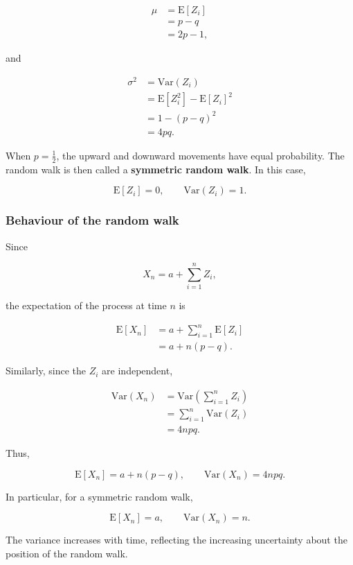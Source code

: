 \documentclass[
  letterpaper,
  DIV=11,
  numbers=noendperiod]{scrartcl}
\theoremstyle{definition}
\theoremstyle{remark}
\begin{document}
\[
\begin{aligned}
\mu
&=\mathrm{E}[Z_i]\\
&=p-q\\
&=2p-1,
\end{aligned}
\]

and

\[
\begin{aligned}
\sigma^2
&=\mathrm{Var}(Z_i)\\
&=\mathrm{E}[Z_i^2]-{\mathrm{E}[Z_i]}^2\\
&=1-(p-q)^2\\
&=4pq.
\end{aligned}
\]

When \(p=\frac12\), the upward and downward movements have equal
probability. The random walk is then called a \textbf{symmetric random
walk}. In this case,

\[
\mathrm{E}[Z_i]=0,
\qquad
\mathrm{Var}(Z_i)=1.
\]

\subsubsection{Behaviour of the random
walk}\label{behaviour-of-the-random-walk}

Since

\[
X_n=a+\sum_{i=1}^n Z_i,
\]

the expectation of the process at time \(n\) is

\[
\begin{aligned}
\mathrm{E}[X_n]
&=a+\sum_{i=1}^n\mathrm{E}[Z_i]\\
&=a+n(p-q).
\end{aligned}
\]

Similarly, since the \(Z_i\) are independent,

\[
\begin{aligned}
\mathrm{Var}(X_n)
&=\mathrm{Var}\left(\sum_{i=1}^n Z_i\right)\\
&=\sum_{i=1}^n\mathrm{Var}(Z_i)\\
&=4npq.
\end{aligned}
\]

Thus,

\[
\boxed{
\mathrm{E}[X_n]=a+n(p-q),
\qquad
\mathrm{Var}(X_n)=4npq.
}
\]

In particular, for a symmetric random walk,

\[
\mathrm{E}[X_n]=a,
\qquad
\mathrm{Var}(X_n)=n.
\]

The variance increases with time, reflecting the increasing uncertainty
about the position of the random walk.
\end{document}
